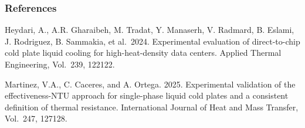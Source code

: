 \subsubsection{References}\label{references-coilcoolingitecoldplate}

Heydari, A., A.R. Gharaibeh, M. Tradat, Y. Manaserh, V. Radmard, B. Eslami, J. Rodriguez, B. Sammakia, et al.~2024. Experimental evaluation of direct-to-chip cold plate liquid cooling for high-heat-density data centers. Applied Thermal Engineering, Vol.~239, 122122.

Martinez, V.A., C. Caceres, and A. Ortega. 2025. Experimental validation of the effectiveness-NTU approach for single-phase liquid cold plates and a consistent definition of thermal resistance. International Journal of Heat and Mass Transfer, Vol.~247, 127128.
